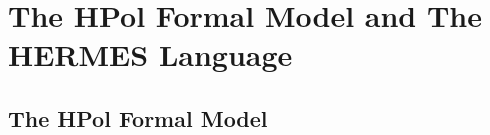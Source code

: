 \documentclass[12pt,letterpaper]{report}
\begin{document}




\chapter{The HPol Formal Model and The HERMES Language}
\label{Chapter:HPolFormalModel}



\section{The HPol Formal Model}
\end{document}

